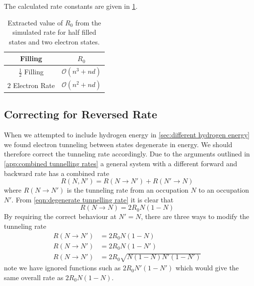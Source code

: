 The calculated rate constants
are given in \cref{tab:extracted rate constant}.
\begin{table}[htbp]
    \begin{center}
        \begin{tabular}{ *{2}{c} }
            \toprule
            Filling                 & \(R_0\)                    \\
            \midrule
            \(\frac{1}{2}\) Filling & \(\mathcal{O}(n^3 + n d)\) \\
            \(2\) Electron Rate     & \(\mathcal{O}(n^2 + n d)\) \\
            \bottomrule
        \end{tabular}
    \end{center}
    \caption{Extracted value of \(R_0\) from the
        simulated rate for half filled
        states and two electron states.
    }\label{tab:extracted rate constant}
\end{table}

\subsection{Correcting for Reversed Rate}
When we attempted to include hydrogen
energy in \cref{sec:different hydrogen energy}
we found electron tunneling between states
degenerate in energy. We should therefore
correct the tunneling rate accordingly.
Due to
the arguments outlined in
\cref{app:combined tunnelling rates}
a general system with a different
forward and backward rate has a combined rate
\begin{equation}
    R(N,N') = R(N\rightarrow{}N') + R(N'\rightarrow{}N)
\end{equation}
where \(R(N\rightarrow{}N')\) is the
tunneling rate from an occupation \(N\)
to an occupation \(N'\). From
\cref{eqn:degenerate tunnelling rate}
it is clear that
\begin{equation}
    R(N\rightarrow{}N) = 2R_0N(1-N)
\end{equation}
By requiring the correct
behaviour at \(N' = N\), there are
three ways to modify the tunneling
rate
\begin{align}
    R(N\rightarrow{}N') & = 2R_0N(1-N)                 \\
    R(N\rightarrow{}N') & = 2R_0N(1-N')                \\
    R(N\rightarrow{}N') & = 2R_0 \sqrt{N(1-N)N'(1-N')}
\end{align}
note we have ignored functions
such as \(2R_0N'(1-N')\) which
would give the same overall rate
as \(2R_0N(1-N)\).

